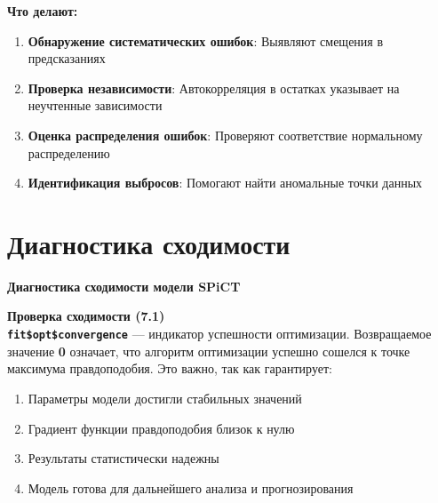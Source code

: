 \documentclass[
  letterpaper,
  DIV=11,
  numbers=noendperiod]{scrreprt}
\newenvironment{Shaded}{\begin{snugshade}}{\end{snugshade}}
\newcommand{\CommentTok}[1]{\textcolor[rgb]{0.37,0.37,0.37}{#1}}
\newcommand{\DocumentationTok}[1]{\textcolor[rgb]{0.37,0.37,0.37}{\textit{#1}}}
\newcommand{\FunctionTok}[1]{\textcolor[rgb]{0.28,0.35,0.67}{#1}}
\newcommand{\NormalTok}[1]{\textcolor[rgb]{0.00,0.23,0.31}{#1}}
\newcommand{\SpecialCharTok}[1]{\textcolor[rgb]{0.37,0.37,0.37}{#1}}
\begin{document}
\textbf{Что делают:}

\begin{enumerate}
\def\labelenumi{\arabic{enumi}.}
\item
  \textbf{Обнаружение систематических ошибок}: Выявляют смещения в
  предсказаниях
\item
  \textbf{Проверка независимости}: Автокорреляция в остатках указывает
  на неучтенные зависимости
\item
  \textbf{Оценка распределения ошибок}: Проверяют соответствие
  нормальному распределению
\item
  \textbf{Идентификация выбросов}: Помогают найти аномальные точки
  данных
\end{enumerate}

\section{Диагностика
сходимости}\label{ux434ux438ux430ux433ux43dux43eux441ux442ux438ux43aux430-ux441ux445ux43eux434ux438ux43cux43eux441ux442ux438}

\begin{Shaded}
\end{Shaded}

\textbf{Диагностика сходимости модели SPiCT}

\textbf{Проверка сходимости (7.1)}\\
\textbf{\texttt{fit\$opt\$convergence}} --- индикатор успешности
оптимизации. Возвращаемое значение \textbf{0} означает, что алгоритм
оптимизации успешно сошелся к точке максимума правдоподобия. Это важно,
так как гарантирует:

\begin{enumerate}
\def\labelenumi{\arabic{enumi}.}
\item
  Параметры модели достигли стабильных значений
\item
  Градиент функции правдоподобия близок к нулю
\item
  Результаты статистически надежны
\item
  Модель готова для дальнейшего анализа и прогнозирования
\end{enumerate}
\end{document}
